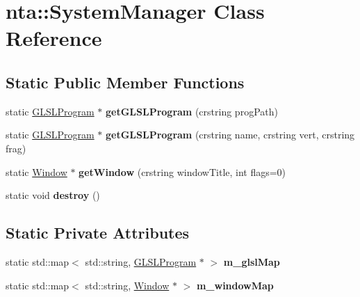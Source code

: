 \hypertarget{classnta_1_1SystemManager}{}\section{nta\+:\+:System\+Manager Class Reference}
\label{classnta_1_1SystemManager}
\subsection*{Static Public Member Functions}
\begin{DoxyCompactItemize}
\item 
\mbox{\label{classnta_1_1SystemManager_af37be3ff4538da0a95b5ca257187077c}} 
static \hyperlink{classnta_1_1GLSLProgram}{G\+L\+S\+L\+Program} $\ast$ {\bfseries get\+G\+L\+S\+L\+Program} (crstring prog\+Path)
\item 
\mbox{\label{classnta_1_1SystemManager_a656e005054ec89f1370616aa499b8a1a}} 
static \hyperlink{classnta_1_1GLSLProgram}{G\+L\+S\+L\+Program} $\ast$ {\bfseries get\+G\+L\+S\+L\+Program} (crstring name, crstring vert, crstring frag)
\item 
\mbox{\label{classnta_1_1SystemManager_af3577fda5a1a1019f51fbc352047dc1f}} 
static \hyperlink{classnta_1_1Window}{Window} $\ast$ {\bfseries get\+Window} (crstring window\+Title, int flags=0)
\item 
\mbox{\label{classnta_1_1SystemManager_a69721eaa78fda16f0f028d2991672282}} 
static void {\bfseries destroy} ()
\end{DoxyCompactItemize}
\subsection*{Static Private Attributes}
\begin{DoxyCompactItemize}
\item 
\mbox{\label{classnta_1_1SystemManager_a22703ea675725af427acc8a19853fb4d}} 
static std\+::map$<$ std\+::string, \hyperlink{classnta_1_1GLSLProgram}{G\+L\+S\+L\+Program} $\ast$ $>$ {\bfseries m\+\_\+glsl\+Map}
\item 
\mbox{\label{classnta_1_1SystemManager_ad19f3250449b0ddad40bf42601d36b1a}} 
static std\+::map$<$ std\+::string, \hyperlink{classnta_1_1Window}{Window} $\ast$ $>$ {\bfseries m\+\_\+window\+Map}
\end{DoxyCompactItemize}


